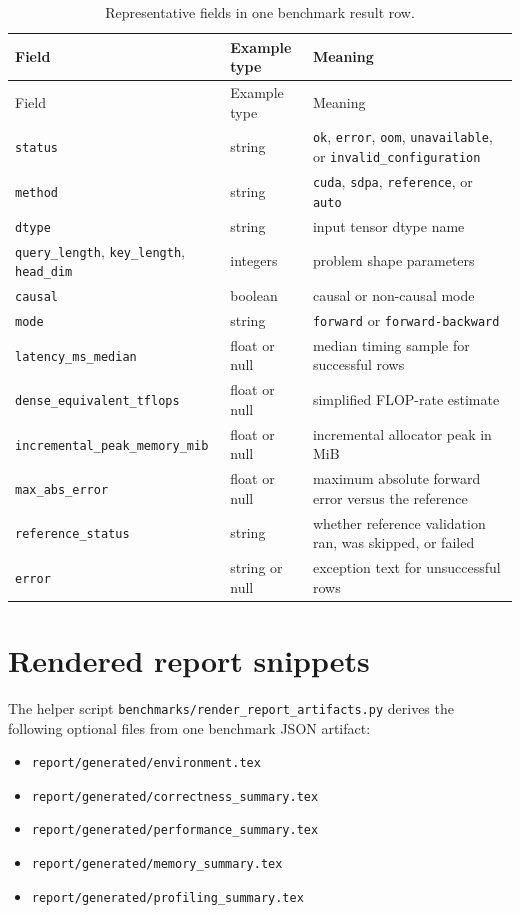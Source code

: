 \begin{longtable}{@{}p{} p{} p{}@{}}
\caption{Representative fields in one benchmark result row.}
\label{tab:result-row-fields}\\
\toprule
Field & Example type & Meaning \\
\midrule
\endfirsthead
\toprule
Field & Example type & Meaning \\
\midrule
\endhead
\texttt{status} & string & \texttt{ok}, \texttt{error}, \texttt{oom}, \texttt{unavailable}, or \texttt{invalid\_configuration} \\
\texttt{method} & string & \texttt{cuda}, \texttt{sdpa}, \texttt{reference}, or \texttt{auto} \\
\texttt{dtype} & string & input tensor dtype name \\
\texttt{query\_length}, \texttt{key\_length}, \texttt{head\_dim} & integers & problem shape parameters \\
\texttt{causal} & boolean & causal or non-causal mode \\
\texttt{mode} & string & \texttt{forward} or \texttt{forward-backward} \\
\texttt{latency\_ms\_median} & float or null & median timing sample for successful rows \\
\texttt{dense\_equivalent\_tflops} & float or null & simplified FLOP-rate estimate \\
\texttt{incremental\_peak\_memory\_mib} & float or null & incremental allocator peak in MiB \\
\texttt{max\_abs\_error} & float or null & maximum absolute forward error versus the reference \\
\texttt{reference\_status} & string & whether reference validation ran, was skipped, or failed \\
\texttt{error} & string or null & exception text for unsuccessful rows \\
\bottomrule
\end{longtable}

\section{Rendered report snippets}

The helper script \texttt{benchmarks/render\_report\_artifacts.py} derives the following optional files from one benchmark JSON artifact:
\begin{itemize}
  \item \texttt{report/generated/environment.tex}
  \item \texttt{report/generated/correctness\_summary.tex}
  \item \texttt{report/generated/performance\_summary.tex}
  \item \texttt{report/generated/memory\_summary.tex}
  \item \texttt{report/generated/profiling\_summary.tex}
\end{itemize}

